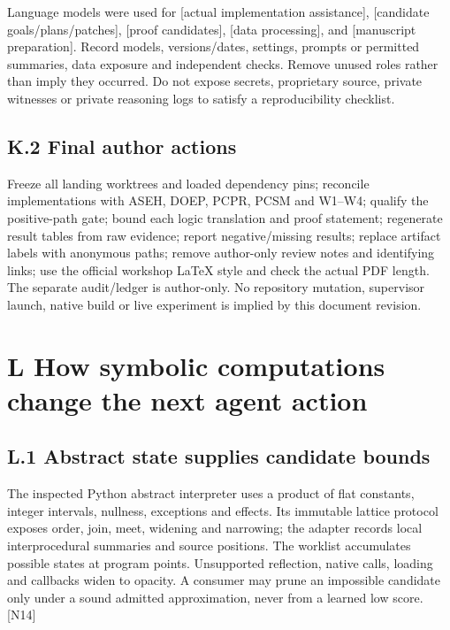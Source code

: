 Language models were used for [actual implementation assistance], [candidate goals/plans/patches],
[proof candidates], [data processing], and [manuscript preparation]. Record models, versions/dates,
settings, prompts or permitted summaries, data exposure and independent checks. Remove unused
roles rather than imply they occurred. Do not expose secrets, proprietary source, private witnesses or
private reasoning logs to satisfy a reproducibility checklist.

\subsection*{K.2 Final author actions}

Freeze all landing worktrees and loaded dependency pins; reconcile implementations with ASEH,
DOEP, PCPR, PCSM and W1–W4; qualify the positive-path gate; bound each logic translation and
proof statement; regenerate result tables from raw evidence; report negative/missing results; replace
artifact labels with anonymous paths; remove author-only review notes and identifying links; use
the official workshop LaTeX style and check the actual PDF length. The separate audit/ledger is
author-only. No repository mutation, supervisor launch, native build or live experiment is implied by
this document revision.

\section*{L How symbolic computations change the next agent action}
\subsection*{L.1 Abstract state supplies candidate bounds}

The inspected Python abstract interpreter uses a product of flat constants, integer intervals, nullness,
exceptions and effects. Its immutable lattice protocol exposes order, join, meet, widening and
narrowing; the adapter records local interprocedural summaries and source positions. The worklist
accumulates possible states at program points. Unsupported reflection, native calls, loading and
callbacks widen to opacity. A consumer may prune an impossible candidate only under a sound
admitted approximation, never from a learned low score. [N14]

